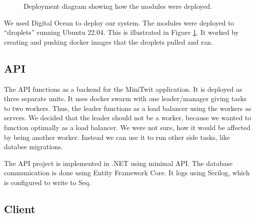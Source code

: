 \begin{figure}[H]
      \centering
      \caption{Deployment diagram showing how the modules were deployed.}
      \label{fig:deployment_diagram}
\end{figure}

We used Digital Ocean to deploy our system.
The modules were deployed to ``droplets'' running Ubuntu 22.04.
This is illustrated in Figure \ref{fig:deployment_diagram}.
It worked by creating and pushing docker images that the 
droplets pulled and ran.

\subsection{API}

The API functions as a backend for the MiniTwit application.
It is deployed as three separate units. 
It uses docker swarm with one leader/manager 
giving tasks to two workers. Thus, the leader functions as a 
load balancer using the workers as servers.
We decided that the leader should not be a worker,
because we wanted to function optimally as a load balancer.
We were not sure, how it would be affected by being another worker.
Instead we can use it to run other side tasks, like databse migrations.

The API project is implemented in .NET using minimal API.
The database communication is done using Entity Framework Core.
It logs using Serilog\cite{serilog}, 
which is configured to write to Seq\cite{seq}.

\subsection{Client}

